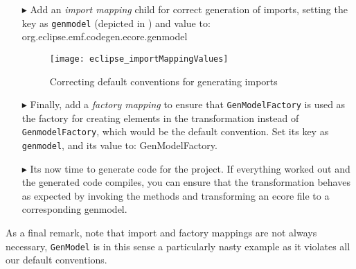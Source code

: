 \begin{enumerate}
\item[$\blacktriangleright$] Add an \emph{import mapping} child for correct generation of imports, setting the key as \texttt{genmodel} (depicted in ) and value to: \\
{\small \ttfamily \hspace*{0.5cm} org.\-eclipse.\-emf.\-codegen.\-ecore.\-genmodel}

\vspace{0.5cm}

\begin{figure}[htbp]
\begin{centering}
\texttt{[image: eclipse\_importMappingValues]}
  \caption{Correcting default conventions for generating imports}  
  \label{eclipse:impMapValues}
\end{centering}
\end{figure} 

\item [$\blacktriangleright$] Finally, add a \emph{factory mapping} to ensure that \texttt{GenModelFactory} is used as the factory for creating elements in the
transformation instead of \texttt{Genmodel\-Factory}, which would be the default convention. Set its key as \texttt{genmodel}, and its value to:
{\small \ttfamily GenModelFactory}.

\item [$\blacktriangleright$] Its now time to generate code for the project.
If everything worked out and the generated code compiles, you can ensure that the transformation behaves as expected by invoking the methods and transforming an ecore file to a corresponding genmodel.

\end{enumerate}


As a final remark, note that import and factory mappings are not always necessary, \texttt{GenModel} is in this sense a particularly nasty example as it violates all our default conventions.
 